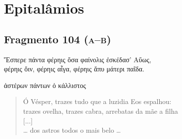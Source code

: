 \chapter[Epitalâmios: canções de casamento]{Epitalâmios}

\section{Fragmento 104 (\textsc{a--b})}

\begin{gkverse}
Ἔσπερε πάντα φέρηις ὄσα φαίνολις ἐσκέδασ’ Αὔως,\\
      φέρηις ὄιν, φέρηις αἶγα, φέρηις ἄπυ μάτερι παῖδα.\\

      \medskip 

\hspace*{35mm}{\minion [...]}

ἀστέρων πάντων ὀ κάλλιστος
\end{gkverse}

\begin{verse}
Ó Vésper, trazes tudo que a luzidia Eos espalhou:\\
trazes ovelha, trazes cabra, arrebatas da mãe a filha\\[2mm]

\hspace*{35mm}[...]\\[2mm]

\ldots{} dos astros todos o mais belo \ldots{} 
\end{verse}

\medskip

